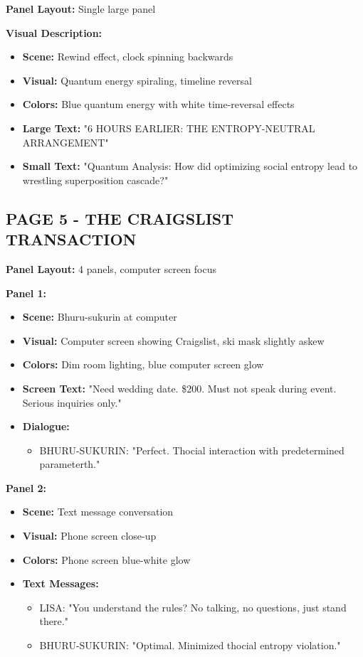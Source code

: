 \documentclass[12pt,a4paper]{article}
\begin{document}
\textbf{Panel Layout:} Single large panel

\textbf{Visual Description:}
\begin{itemize}
\item \textbf{Scene:} Rewind effect, clock spinning backwards
\item \textbf{Visual:} Quantum energy spiraling, timeline reversal
\item \textbf{Colors:} Blue quantum energy with white time-reversal effects
\item \textbf{Large Text:} "6 HOURS EARLIER: THE ENTROPY-NEUTRAL ARRANGEMENT"
\item \textbf{Small Text:} "Quantum Analysis: How did optimizing social entropy lead to wrestling superposition cascade?"
\end{itemize}

\subsection{PAGE 5 - THE CRAIGSLIST TRANSACTION}

\textbf{Panel Layout:} 4 panels, computer screen focus

\textbf{Panel 1:}
\begin{itemize}
\item \textbf{Scene:} Bhuru-sukurin at computer
\item \textbf{Visual:} Computer screen showing Craigslist, ski mask slightly askew
\item \textbf{Colors:} Dim room lighting, blue computer screen glow
\item \textbf{Screen Text:} "Need wedding date. \$200. Must not speak during event. Serious inquiries only."
\item \textbf{Dialogue:}
\begin{itemize}
\item BHURU-SUKURIN: "Perfect. Thocial interaction with predetermined parameterth."
\end{itemize}
\end{itemize}

\textbf{Panel 2:}
\begin{itemize}
\item \textbf{Scene:} Text message conversation
\item \textbf{Visual:} Phone screen close-up
\item \textbf{Colors:} Phone screen blue-white glow
\item \textbf{Text Messages:}
\begin{itemize}
\item LISA: "You understand the rules? No talking, no questions, just stand there."
\item BHURU-SUKURIN: "Optimal. Minimized thocial entropy violation."
\end{itemize}
\end{itemize}
\end{document}
